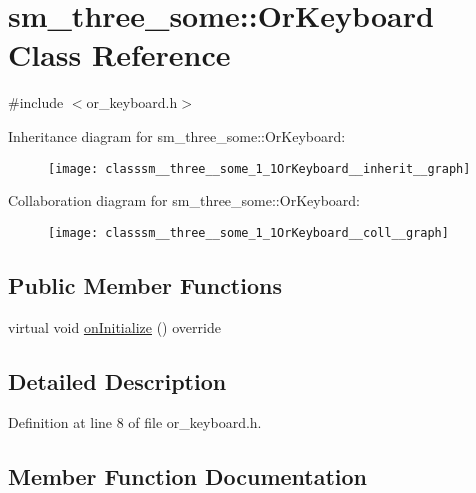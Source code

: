 \hypertarget{classsm__three__some_1_1OrKeyboard}{}\section{sm\+\_\+three\+\_\+some\+:\+:Or\+Keyboard Class Reference}
\label{classsm__three__some_1_1OrKeyboard}


{\ttfamily \#include $<$or\+\_\+keyboard.\+h$>$}



Inheritance diagram for sm\+\_\+three\+\_\+some\+:\+:Or\+Keyboard\+:
\nopagebreak
\begin{figure}[H]
\begin{center}
\leavevmode
\texttt{[image: classsm\_\_three\_\_some\_1\_1OrKeyboard\_\_inherit\_\_graph]}
\end{center}
\end{figure}


Collaboration diagram for sm\+\_\+three\+\_\+some\+:\+:Or\+Keyboard\+:
\nopagebreak
\begin{figure}[H]
\begin{center}
\leavevmode
\texttt{[image: classsm\_\_three\_\_some\_1\_1OrKeyboard\_\_coll\_\_graph]}
\end{center}
\end{figure}
\subsection*{Public Member Functions}
\begin{DoxyCompactItemize}
\item 
virtual void \hyperlink{classsm__three__some_1_1OrKeyboard_af49faa7c511ae0232ed0931ce8c85b56}{on\+Initialize} () override
\end{DoxyCompactItemize}


\subsection{Detailed Description}


Definition at line 8 of file or\+\_\+keyboard.\+h.



\subsection{Member Function Documentation}
